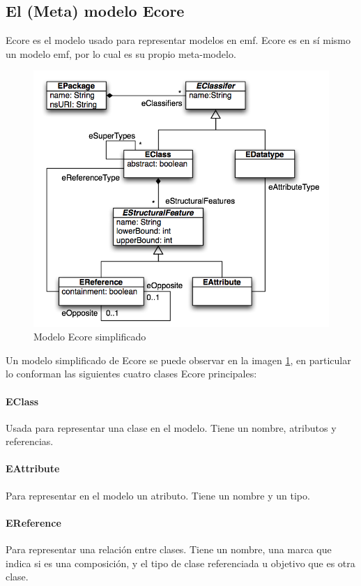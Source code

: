 \documentclass[a4paper,12pt,oneside,spanish]{book}
\begin{document}
\subsection{El (Meta) modelo Ecore}

Ecore es el modelo usado para representar modelos en \gls{emf}. Ecore es en sí mismo un modelo \gls{emf}, por lo cual es su propio meta-modelo. 

\begin{figure}[hbtp]
\centering
\includegraphics[scale=1]{./img/Ecore}
\caption{Modelo Ecore simplificado}
\label{fig:EcoreModel}
\end{figure}

Un modelo simplificado de Ecore se puede observar en la imagen \ref{fig:EcoreModel}, en particular lo conforman las siguientes cuatro clases Ecore principales:

\paragraph{EClass} Usada para representar una clase en el modelo. Tiene un nombre, atributos y referencias.

\paragraph{EAttribute} Para representar en el modelo un atributo. Tiene un nombre y un tipo.

\paragraph{EReference} Para representar una relación entre clases. Tiene un nombre, una marca que indica si es una composición, y el tipo de clase referenciada u objetivo que es otra clase.
\end{document}
